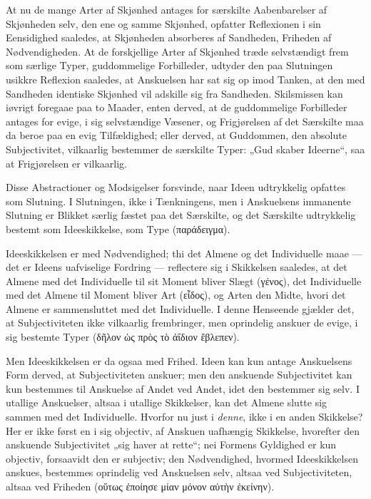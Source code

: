 \documentclass[12pt]{book}
\newcommand{\opage}[1]{\marginnote{\footnotesize\textit{[#1]}}}
\begin{document}
At nu de mange Arter af Skjønhed antages for særskilte Aabenbarelser af Skjønheden selv, den ene og samme Skjønhed, opfatter Reflexionen i sin Eensidighed saaledes, at Skjønheden absorberes af Sandheden, Friheden af Nødvendigheden. At de forskjellige Arter af Skjønhed træde selvstændigt frem som særlige Typer, guddommelige Forbilleder, udtyder den paa Slutningen usikkre Reflexion saaledes, at Anskuelsen har sat sig op imod Tanken, at den med Sandheden identiske Skjønhed vil adskille sig fra Sandheden. Skilsmissen kan iøvrigt foregaae paa to Maader, enten derved, at de guddommelige Forbilleder antages for evige, i sig selvstændige Væsener, og Frigjørelsen af det Særskilte maa da beroe paa en evig Tilfældighed; eller derved, at Guddommen, den absolute Subjectivitet, vilkaarlig bestemmer de særskilte Typer: „Gud skaber Ideerne“, saa at Frigjørelsen er vilkaarlig.

Disse Abstractioner og Modsigelser forsvinde, naar Ideen udtrykkelig opfattes som Slutning. I Slutningen, ikke i Tænkningens, men i Anskuelsens immanente Slutning er Blikket særlig fæstet paa det Særskilte, og det Særskilte udtrykkelig bestemt som Ideeskikkelse, som Type (παράδειγμα).

Ideeskikkelsen er med Nødvendighed; thi det Almene og det Individuelle maae --- det er Ideens uafviselige Fordring --- reflectere sig i Skikkelsen saaledes, at det Almene med det Individuelle til sit Moment bliver Slægt (γένος), det Individuelle med det Almene til Moment bliver Art (εἶδος), og Arten den Midte, hvori det Almene er sammensluttet med det Individuelle. I denne Henseende gjælder det, at Subjectiviteten ikke vilkaarlig frembringer, men oprindelig anskuer de
\opage{380}evige, i sig bestemte Typer (δῆλον ὡς πρὸς τὸ ἀΐδιον ἔβλεπεν).

Men Ideeskikkelsen er da ogsaa med Frihed. Ideen kan kun antage Anskuelsens Form derved, at Subjectiviteten anskuer; men den anskuende Subjectivitet kan kun bestemmes til Anskuelse af Andet ved Andet, idet den bestemmer sig selv. I utallige Anskuelser, altsaa i utallige Skikkelser, kan det Almene slutte sig sammen med det Individuelle. Hvorfor nu just i \emph{denne}, ikke i en anden Skikkelse? Her er ikke først en i sig objectiv, af Anskuen uafhængig Skikkelse, hvorefter den anskuende Subjectivitet „sig haver at rette“; nei Formens Gyldighed er kun objectiv, forsaavidt den er subjectiv; den Nødvendighed, hvormed Ideeskikkelsen anskues, bestemmes oprindelig ved Anskuelsen selv, altsaa ved Subjectiviteten, altsaa ved Friheden (οὕτως ἐποίησε μίαν μόνον αὐτὴν ἐκείνην).
\end{document}
